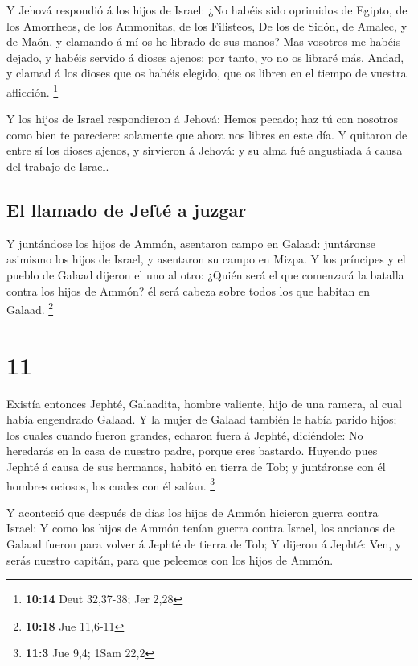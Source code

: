  Y Jehová respondió á los hijos de Israel: ¿No habéis
sido oprimidos de Egipto, de los Amorrheos, de los Ammonitas, de los
Filisteos,  De los de Sidón, de Amalec, y de Maón, y
clamando á mí os he librado de sus manos?  Mas vosotros
me habéis dejado, y habéis servido á dioses ajenos: por tanto, yo no os
libraré más.  Andad, y clamad á los dioses que os habéis
elegido, que os libren en el tiempo de vuestra aflicción. \footnote{\textbf{10:14}
  Deut 32,37-38; Jer 2,28}

 Y los hijos de Israel respondieron á Jehová: Hemos
pecado; haz tú con nosotros como bien te pareciere: solamente que ahora
nos libres en este día.  Y quitaron de entre sí los
dioses ajenos, y sirvieron á Jehová: y su alma fué angustiada á causa
del trabajo de Israel.

\hypertarget{el-llamado-de-jeftuxe9-a-juzgar}{%
\subsection{El llamado de Jefté a
juzgar}\label{el-llamado-de-jeftuxe9-a-juzgar}}

 Y juntándose los hijos de Ammón, asentaron campo en
Galaad: juntáronse asimismo los hijos de Israel, y asentaron su campo en
Mizpa.  Y los príncipes y el pueblo de Galaad dijeron el
uno al otro: ¿Quién será el que comenzará la batalla contra los hijos de
Ammón? él será cabeza sobre todos los que habitan en Galaad. \footnote{\textbf{10:18}
  Jue 11,6-11}

\hypertarget{section-10}{%
\section{11}\label{section-10}}

 Existía entonces Jephté, Galaadita, hombre valiente, hijo
de una ramera, al cual había engendrado Galaad.  Y la
mujer de Galaad también le había parido hijos; los cuales cuando fueron
grandes, echaron fuera á Jephté, diciéndole: No heredarás en la casa de
nuestro padre, porque eres bastardo.  Huyendo pues Jephté
á causa de sus hermanos, habitó en tierra de Tob; y juntáronse con él
hombres ociosos, los cuales con él salían. \footnote{\textbf{11:3} Jue
  9,4; 1Sam 22,2}

 Y aconteció que después de días los hijos de Ammón
hicieron guerra contra Israel:  Y como los hijos de Ammón
tenían guerra contra Israel, los ancianos de Galaad fueron para volver á
Jephté de tierra de Tob;  Y dijeron á Jephté: Ven, y serás
nuestro capitán, para que peleemos con los hijos de Ammón.

